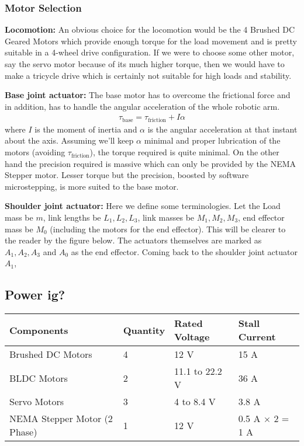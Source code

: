 \documentclass[12pt]{article}
\begin{document}
\subsubsection*{Motor Selection}
\textbf{Locomotion:} An obvious choice for the locomotion would be the 4 Brushed DC Geared Motors which provide enough torque for the load movement and is pretty suitable in a 4-wheel drive configuration.
\newline
If we were to choose some other motor, say the servo motor because of its much higher torque, then we would have to make a tricycle drive which is certainly not suitable for high loads and stability.

\textbf{Base joint actuator:} The base motor has to overcome the frictional force and in addition, has to handle the angular acceleration of the whole robotic arm.
\begin{align}
    \tau_{\text{base}} = \tau_{\text{friction}} + I\alpha
\end{align}
where $I$ is the moment of inertia and $\alpha$ is the angular acceleration at that instant about the axis.
\newline
Assuming we'll keep $\alpha$ minimal and proper lubrication of the motors (avoiding $\tau_{\text{friction}}$), the torque required is quite minimal. On the other hand the precision required is massive which can only be provided by the NEMA Stepper motor. Lesser torque but the precision, boosted by software microstepping, is more suited to the base motor.

\textbf{Shoulder joint actuator:} Here we define some terminologies. Let the Load mass be $m$, link lengths be $L_1, L_2, L_3$, link masses be $M_1, M_2, M_3$, end effector mass be $M_0$ (including the motors for the end effector). This will be clearer to the reader by the figure below. The actuators themselves are marked as $A_1, A_2, A_3$ and $A_0$ as the end effector.
\newline
Coming back to the shoulder joint actuator $A_1$, 

\subsection*{Power ig?}

\begin{table}[h]
\centering
\begin{tabular}{llll}
\toprule
\textbf{Components} & \textbf{Quantity} & \textbf{Rated Voltage} & \textbf{Stall Current} \\
\midrule
Brushed DC Motors & 4 & 12 V & 15 A \\
BLDC Motors & 2 & 11.1 to 22.2 V & 36 A \\
Servo Motors & 3 & 4 to 8.4 V & 3.8 A \\
NEMA Stepper Motor (2 Phase) & 1 & 12 V & 0.5 A $\times$ 2 = 1 A \\
\bottomrule
\end{tabular}
\end{table}
\end{document}
